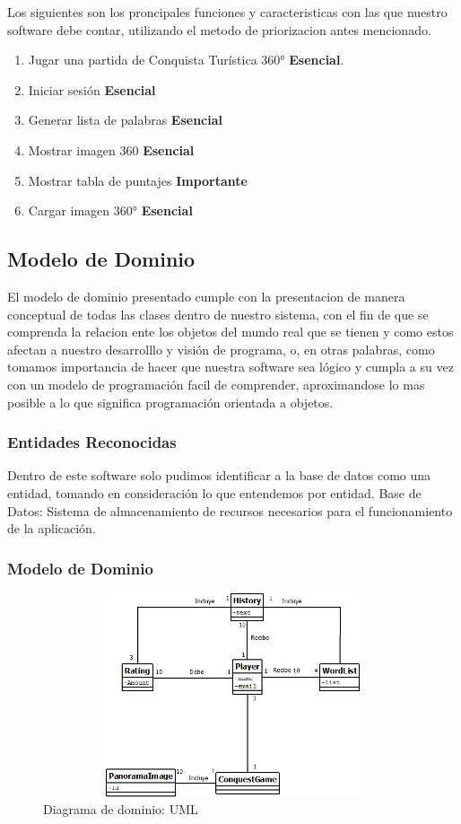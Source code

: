 Los siguientes son los proncipales funciones y caracteristicas con las que nuestro software debe contar, utilizando el metodo de priorizacion antes mencionado.

\begin{enumerate}[1.]
	\item Jugar una partida de Conquista Turística 360° \textbf{Esencial}.
	\item Iniciar sesión \textbf{Esencial}
	\item Generar lista de palabras \textbf{Esencial}
	\item Mostrar imagen 360 \textbf{Esencial}
	\item Mostrar tabla de puntajes \textbf{Importante}
	\item Cargar imagen 360° \textbf{Esencial}
\end{enumerate}

\subsection{Modelo de Dominio}
El modelo de dominio presentado cumple con la presentacion de manera conceptual de todas las clases dentro de nuestro sistema, con el fin de que se comprenda la relacion ente los objetos del mundo real que se tienen y como estos afectan a nuestro desarrolllo y visión de programa, o, en otras palabras, como tomamos importancia de hacer que nuestra software sea lógico y cumpla a su vez con un modelo de programación facil de comprender, aproximandose lo mas posible a lo que significa programación orientada a objetos.
\subsubsection{Entidades Reconocidas}
Dentro de este software solo pudimos identificar a la base de datos como una entidad, tomando en consideración lo que entendemos por entidad.
Base de Datos: Sistema de almacenamiento de recursos necesarios para el funcionamiento de la aplicación.
\subsubsection{Modelo de Dominio}
\begin{figure}[H]
\centering
   \includegraphics[width=14cm, height=6cm]{imgs/ModeloDominio.png}
   \begin{center}
   \caption{Diagrama de dominio: UML}
   \end{center}
\end{figure}
